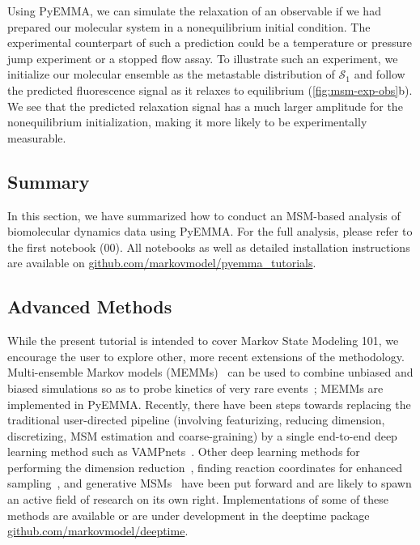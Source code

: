 \documentclass[9pt,tutorial]{livecoms}
\newcommand{\githubrepository}{\url{github.com/markovmodel/pyemma_tutorials}}
\begin{document}
Using PyEMMA, we can simulate the relaxation of an observable if we had prepared our molecular system in a nonequilibrium initial condition.
The experimental counterpart of such a prediction could be a temperature or pressure jump experiment or a stopped flow assay.
To illustrate such an experiment, we initialize our molecular ensemble as the metastable distribution of $\mathcal{S}_1$ and follow the predicted fluorescence signal as it relaxes to equilibrium (\ref{fig:msm-exp-obs}b).
We see that the predicted relaxation signal has a much larger amplitude for the nonequilibrium initialization, making it more likely to be experimentally measurable.

\subsection{Summary}

In this section, we have summarized how to conduct an MSM-based analysis of biomolecular dynamics data using PyEMMA.
For the full analysis, please refer to the first notebook (00).
All notebooks as well as detailed installation instructions are available on \githubrepository{}.

\subsection{Advanced Methods}

While the present tutorial is intended to cover Markov State Modeling 101, we encourage the user to explore other, more recent extensions of the methodology.
Multi-ensemble Markov models (MEMMs)~\cite{dtram,tram} can be used to combine unbiased and biased simulations so as to probe kinetics of very rare events~\cite{trammbar}; MEMMs are implemented in PyEMMA.
Recently, there have been steps towards replacing the traditional user-directed pipeline (involving featurizing, reducing dimension, discretizing, MSM estimation and coarse-graining) by a single end-to-end deep learning method such as VAMPnets~\cite{vampnet}.
Other deep learning methods for performing the dimension reduction~\cite{tae}, finding reaction coordinates for enhanced sampling~\cite{hernandez-vde,Sultan2018-vde-enhanced-sampling,Ribeiro2018-rave}, and generative MSMs~\cite{deep-gen-msm-preprint} have been put forward and are likely to spawn an active field of research on its own right.
Implementations of some of these methods are available or are under development in the deeptime package \url{github.com/markovmodel/deeptime}. 
\end{document}
